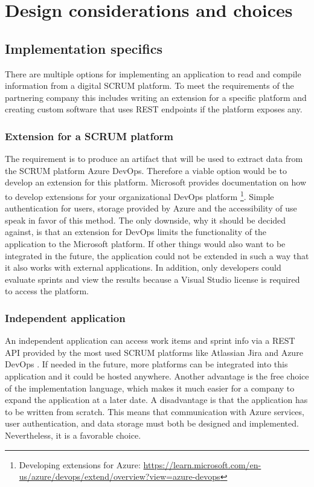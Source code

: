 \newpage

\section{Design considerations and choices}

\subsection{Implementation specifics}

There are multiple options for implementing an application to read and compile 
information from a digital SCRUM platform.
To meet the requirements of the partnering company this includes writing an extension for a 
specific platform and creating custom software that uses 
REST endpoints if the platform exposes any.

\subsubsection*{Extension for a SCRUM platform}
The requirement is to produce an artifact that will be used to extract 
data from the SCRUM platform Azure DevOps. 
Therefore a viable option would be to develop an extension for this platform.
Microsoft provides documentation on how to develop extensions for your 
organizational DevOps platform \footnote{Developing extensions for Azure: \url{https://learn.microsoft.com/en-us/azure/devops/extend/overview?view=azure-devops}}.
Simple authentication for users, storage provided by Azure and the 
accessibility of use speak in favor of this method.
The only downside, why it should be decided against, is that an extension for 
DevOps limits the functionality of the application to the Microsoft platform. 
If other things would also want to be integrated in the future, 
the application could not be extended in such a way that it 
also works with external applications. 
In addition, only developers could evaluate sprints and view the 
results because a Visual Studio license is required to access the platform.

\subsubsection*{Independent application}
An independent application can access work items and sprint info via a REST API provided by the most used SCRUM platforms like Atlassian Jira and Azure DevOps \parencite{TopTenScrum}.
If needed in the future, more platforms can be integrated into this 
application and it could be hosted anywhere. 
Another advantage is the free choice of the implementation language, 
which makes it much easier for a company to expand the application at a later date. 
A disadvantage is that the application has to be written from scratch. 
This means that communication with Azure services, user authentication, 
and data storage must both be designed and implemented. 
Nevertheless, it is a favorable choice.

